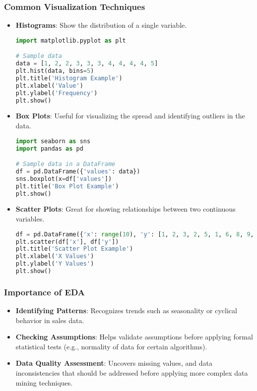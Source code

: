 \documentclass{beamer}
\begin{document}
\begin{frame}[fragile]
    \frametitle{Common Visualization Techniques}
    \begin{itemize}
        \item \textbf{Histograms}: Show the distribution of a single variable.
        \begin{lstlisting}[language=Python]
import matplotlib.pyplot as plt

# Sample data
data = [1, 2, 2, 3, 3, 3, 4, 4, 4, 4, 5]
plt.hist(data, bins=5)
plt.title('Histogram Example')
plt.xlabel('Value')
plt.ylabel('Frequency')
plt.show()
        \end{lstlisting}

        \item \textbf{Box Plots}: Useful for visualizing the spread and identifying outliers in the data.
        \begin{lstlisting}[language=Python]
import seaborn as sns
import pandas as pd

# Sample data in a DataFrame
df = pd.DataFrame({'values': data})
sns.boxplot(x=df['values'])
plt.title('Box Plot Example')
plt.show()
        \end{lstlisting}

        \item \textbf{Scatter Plots}: Great for showing relationships between two continuous variables.
        \begin{lstlisting}[language=Python]
df = pd.DataFrame({'x': range(10), 'y': [1, 2, 3, 2, 5, 1, 6, 8, 9, 5]})
plt.scatter(df['x'], df['y'])
plt.title('Scatter Plot Example')
plt.xlabel('X Values')
plt.ylabel('Y Values')
plt.show()
        \end{lstlisting}
    \end{itemize}
\end{frame}

\begin{frame}
    \frametitle{Importance of EDA}
    \begin{itemize}
        \item \textbf{Identifying Patterns}: Recognizes trends such as seasonality or cyclical behavior in sales data.
        \item \textbf{Checking Assumptions}: Helps validate assumptions before applying formal statistical tests (e.g., normality of data for certain algorithms).
        \item \textbf{Data Quality Assessment}: Uncovers missing values, and data inconsistencies that should be addressed before applying more complex data mining techniques.
    \end{itemize}
\end{frame}
\end{document}

